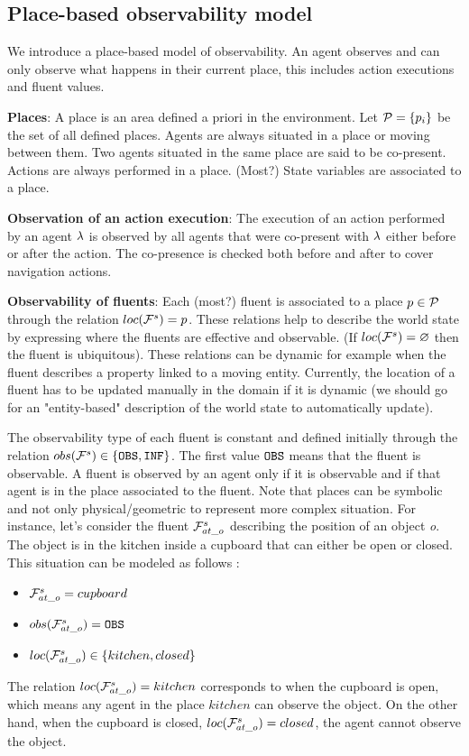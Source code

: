 \documentclass[letterpaper]{article} %
\begin{document}
\subsection{Place-based observability model}

We introduce a place-based model of observability. An agent observes and can only observe what happens in their current place, this includes action executions and fluent values.

\textbf{Places}: 
A place is an area defined a priori in the environment. Let $\mathcal{P}=\{ p_i \}$ be the set of all defined places. Agents are always situated in a place or moving between them. Two agents situated in the same place are said to be co-present. Actions are always performed in a place. (Most?) State variables are associated to a place.

\textbf{Observation of an action execution}: 
The execution of an action performed by an agent $\lambda$ is observed by all agents that were co-present with $\lambda$ either before or after the action. The co-presence is checked both before and after to cover navigation actions.

\textbf{Observability of fluents}:
Each (most?) fluent is associated to a place $p \in \mathcal{P}$ through the relation $loc( \mathcal{F}^{s}_{} )=p$. These relations help to describe the world state by expressing where the fluents are effective and observable. (If $loc( \mathcal{F}^{s}_{} ) = \varnothing $ then the fluent is ubiquitous). These relations can be dynamic for example when the fluent describes a property linked to a moving entity. Currently, the location of a fluent has to be updated manually in the domain if it is dynamic (we should go for an "entity-based" description of the world state to automatically update).

The observability type of each fluent is constant and defined initially through the relation $obs( \mathcal{F}^{s}_{} ) \in \{ \texttt{OBS}, \texttt{INF} \}$. 
The first value $\texttt{OBS}$ means that the fluent is observable. A fluent is observed by an agent only if it is observable and if that agent is in the place associated to the fluent. 
Note that places can be symbolic and not only physical/geometric to represent more complex situation. For instance, let's consider the fluent $\mathcal{F}^{s}_{at\_o}$ describing the position of an object \textit{o}. The object is in the kitchen inside a cupboard that can either be open or closed. This situation can be modeled as follows :
\begin{itemize}
    \item $\mathcal{F}^{s}_{at\_o}=cupboard$
    \item $obs( \mathcal{F}^{s}_{at\_o} )=\texttt{OBS}$
    \item $loc( \mathcal{F}^{s}_{at\_o} ) \in \{ kitchen, closed \}$
\end{itemize}
The relation $loc( \mathcal{F}^{s}_{at\_o} ) = kitchen$ corresponds to when the cupboard is open, which means any agent in the place $kitchen$ can observe the object. On the other hand, when the cupboard is closed, $loc( \mathcal{F}^{s}_{at\_o} ) = closed$, the agent cannot observe the object.
\end{document}
